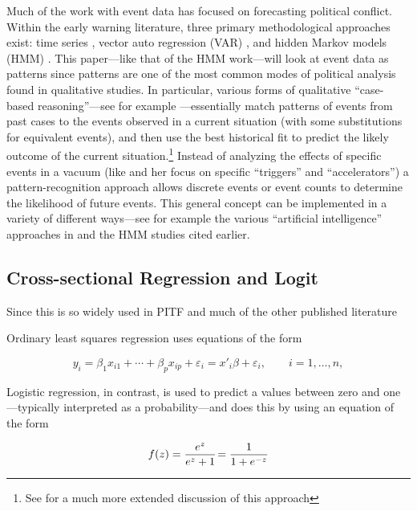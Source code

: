 \documentclass[graybox]{svmult}
\begin{document}
Much of the work with event data has focused on forecasting political conflict. Within the early warning literature, three primary methodological approaches exist: time series \cite{PevehouseGoldstein99, Shellman04SS, Shellman06, HarffGurr98}, vector auto regression (VAR) \cite{Goldstein92,Freeman89}, and hidden Markov models (HMM) \cite{Bond04, Shearer06, Schrodt00, Schrodt06PFP}. This paper---like that of the HMM work---will look at  event data as patterns since patterns are one of the most common modes of political analysis found in qualitative studies. In particular, various forms of qualitative ``case-based reasoning''---see for example \cite{May73, NeustadtMay86, Khong92}---essentially match patterns of events from past cases to the events observed in a current situation (with some substitutions for equivalent events), and then use the best historical fit to predict the likely outcome of the current situation.\footnote{See \cite[chapter 6] {Schrodt04} for a much more extended discussion of this approach}   Instead of analyzing the effects of specific events in a vacuum (like \cite{Harff98} and her focus on specific ``triggers'' and ``accelerators'') a pattern-recognition approach allows discrete events or event counts to determine the likelihood of future events. This general concept can be implemented in a variety of different ways---see for example the various ``artificial intelligence'' approaches in \cite{Hudson91, Schrodt90, BakemanQuera95, Hudson08} and the HMM studies cited earlier. 

\subsection{Cross-sectional Regression and Logit}
\label{sec:logit}

Since this is so widely used in PITF and much of the other published literature

Ordinary least squares regression uses equations of the form

\begin{equation}
 y_i = \beta_1 x_{i1} + \cdots + \beta_p x_{ip} + \varepsilon_i
 = x'_i\beta + \varepsilon_i,
 \qquad i = 1, \ldots, n,
\end{equation}

Logistic regression, in contrast, is used to predict a values between zero and one---typically interpreted as a probability---and does this by using an equation of the form

\begin{equation}
f(z) = \frac{e^{z}}{e^{z} + 1} \! = \frac{1}{1 + e^{-z}} \! \\
\end{equation}
\end{document}
